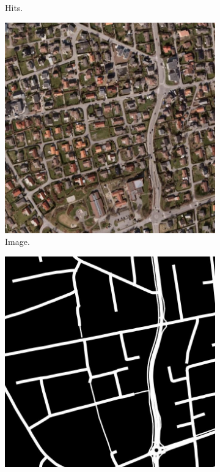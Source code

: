 \begin{figure}[H]
\begin{subfigure}{0.23\textwidth}
\caption{ Hits. }
\vspace{0.2cm} %
\end{subfigure}
\begin{subfigure}{0.23\textwidth}
\includegraphics[width=\textwidth]{figs/appendix/img1160.jpg}
\caption{ Image.}
\vspace{0.2cm} %
\end{subfigure}
\hspace*{\fill} %
\begin{subfigure}{0.23\textwidth}
\includegraphics[width=\textwidth]{figs/appendix/label1160.jpg}

\end{subfigure}
\end{figure}
